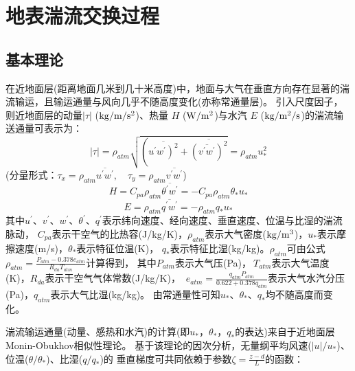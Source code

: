 \chapter{地表湍流交换过程}

\section{基本理论}\label{基本理论}
在近地面层(距离地面几米到几十米高度)中，地面与大气在垂直方向存在显著的湍流输运，且输运通量与风向几乎不随高度变化(亦称常通量层)。
引入尺度因子，则近地面层的动量$\left|\tau\right|$ ($\rm kg/m/s^2$)、热量 $H$ ($\rm W/m^2$)与水汽 $E$ ($\rm kg/m^2/s$)的湍流输送通量可表示为：
\begin{equation}
|\tau|=\rho_{atm} \sqrt{\left(\overline{\left.u^{\prime} w^{\prime}\right)^{2}}+\overline{\left(\overline{v^{\prime} w^{\prime}}\right)^{2}}\right.}=\rho_{atm} u_{*}^{2}
\end{equation}
(分量形式：$\tau_{x}=\rho_{atm} \overline{u^{\prime} w^{\prime}}, \quad \tau_{y}=\rho_{atm} \overline{v^{\prime} w^{\prime}}$)
\begin{equation}
H=C_{p a} \rho_{atm} \overline{\theta^{\prime} w^{\prime}}=-C_{p a} \rho_{atm} \theta_{*} u_{*}
\end{equation}
\begin{equation}
E=\rho_{atm} \overline{q^{\prime} w^{\prime}}=-\rho_{atm} q_{*} u_{*}
\end{equation}
其中$u^\prime$、$v^\prime$、$w^\prime$、$\theta^\prime$、$q^\prime$表示纬向速度、经向速度、垂直速度、位温与比湿的湍流脉动，
$C_{pa}$表示干空气的比热容(J/kg/K)，$\rho_{atm}$表示大气密度($\rm kg/m^3$)，$u_\ast$表示摩擦速度(m/s)，$\theta_\ast$表示特征位温(K)，
$q_\ast$表示特征比湿(kg/kg)。$\rho_{atm}$可由公式$\rho_{atm}=\frac{P_{atm}-0.378e_{atm}}{R_{da}T_{atm}}$计算得到，
其中$P_{atm}$表示大气压(Pa)，$\ T_{atm}$表示大气温度(K)，$R_{da}$表示干空气气体常数(J/kg/K)，
$\ e_{atm}=\frac{q_{atm}P_{atm}}{0.622+0.378q_{atm}}$表示大气水汽分压(Pa)，$q_{atm}$表示大气比湿(kg/kg)。
由常通量性可知$u_\ast$、$\theta_\ast$、$q_\ast$均不随高度而变化。


湍流输运通量(动量、感热和水汽)的计算(即$u_\ast$，$\theta_\ast$，$q_\ast$的表达)来自于近地面层Monin-Obukhov相似性理论。
基于该理论的因次分析，无量纲平均风速($\left|u\right|/u_\ast$)、位温($\theta/\theta_\ast$)、比湿($q/q_\ast$)的
垂直梯度可共同依赖于参数$\zeta=\frac{z-d}{L}$的函数：

